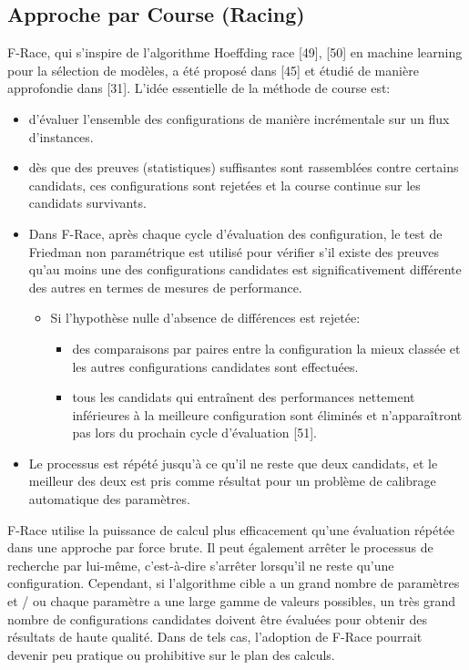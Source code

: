 \documentclass[12pt]{article}
\begin{document}
        \subsection{Approche par Course (Racing)}
            F-Race, qui s'inspire de l'algorithme Hoeffding race [49], [50] en machine learning pour la sélection de modèles, a été proposé dans [45] et étudié de manière approfondie dans [31]. L'idée essentielle de la méthode de course est:
            \begin{itemize}
                \item d'évaluer l’ensemble des configurations de manière incrémentale sur un flux d'instances. 
                \item dès que des preuves (statistiques) suffisantes sont rassemblées contre certains candidats, ces configurations sont rejetées et la course continue sur les candidats survivants. 
                \item Dans F-Race, après chaque cycle d'évaluation des configuration, le test de Friedman non paramétrique est utilisé pour vérifier s'il existe des preuves qu'au moins une des configurations candidates est significativement différente des autres en termes de mesures de performance. 
                    \begin{itemize}
                        \item Si l'hypothèse nulle d'absence de différences est rejetée:
                            \begin{itemize}
                                \item des comparaisons par paires entre la configuration la mieux classée et les autres configurations candidates sont effectuées.
                                \item tous les candidats qui entraînent des performances nettement inférieures à la meilleure configuration sont éliminés et n'apparaîtront pas lors du prochain cycle d'évaluation [51].
                            \end{itemize}
                    \end{itemize}
                \item Le processus est répété jusqu'à ce qu'il ne reste que deux candidats, et le meilleur des deux est pris comme résultat pour un problème de calibrage automatique des paramètres.                
            \end{itemize}
            F-Race utilise la puissance de calcul plus efficacement qu'une évaluation répétée dans une approche par force brute. Il peut également arrêter le processus de recherche par lui-même, c'est-à-dire s'arrêter lorsqu'il ne reste qu'une configuration. Cependant, si l'algorithme cible a un grand nombre de paramètres et / ou chaque paramètre a une large gamme de valeurs possibles, un très grand nombre de configurations candidates doivent être évaluées pour obtenir des résultats de haute qualité. Dans de tels cas, l'adoption de F-Race pourrait devenir peu pratique ou prohibitive sur le plan des calculs.
\end{document}

